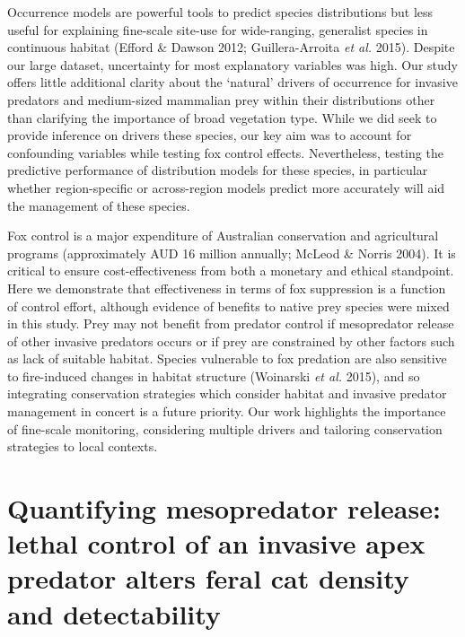 \documentclass[11pt,a4paper,titlepage,twoside,openright]{style/unimelbthesis}
\begin{document}
\begin{mainmatter}
Occurrence models are powerful tools to predict species distributions but less useful for explaining fine-scale site-use for wide-ranging, generalist species in continuous habitat (Efford \& Dawson 2012; Guillera-Arroita \emph{et al.} 2015). Despite our large dataset, uncertainty for most explanatory variables was high. Our study offers little additional clarity about the `natural' drivers of occurrence for invasive predators and medium-sized mammalian prey within their distributions other than clarifying the importance of broad vegetation type. While we did seek to provide inference on drivers these species, our key aim was to account for confounding variables while testing fox control effects. Nevertheless, testing the predictive performance of distribution models for these species, in particular whether region-specific or across-region models predict more accurately will aid the management of these species.

Fox control is a major expenditure of Australian conservation and agricultural programs (approximately AUD 16 million annually; McLeod \& Norris 2004). It is critical to ensure cost-effectiveness from both a monetary and ethical standpoint. Here we demonstrate that effectiveness in terms of fox suppression is a function of control effort, although evidence of benefits to native prey species were mixed in this study. Prey may not benefit from predator control if mesopredator release of other invasive predators occurs or if prey are constrained by other factors such as lack of suitable habitat. Species vulnerable to fox predation are also sensitive to fire-induced changes in habitat structure (Woinarski \emph{et al.} 2015), and so integrating conservation strategies which consider habitat and invasive predator management in concert is a future priority. Our work highlights the importance of fine-scale monitoring, considering multiple drivers and tailoring conservation strategies to local contexts.

\hypertarget{density}{%
\chapter{Quantifying mesopredator release: lethal control of an invasive apex predator alters feral cat density and detectability}\label{density}}

\hypertarget{abstract-2}{%
}
\end{mainmatter}
\end{document}

